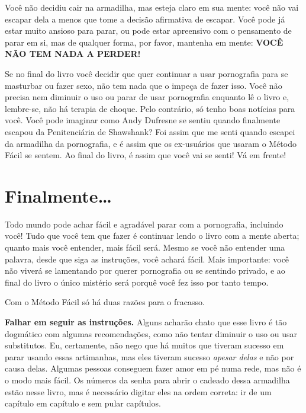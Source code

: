 \documentclass[
  spanish,
  openany]{book}
\begin{document}
Você não decidiu cair na armadilha, mas esteja claro em sua mente: você não vai escapar dela a menos que tome a decisão afirmativa de escapar. Você pode já estar muito ansioso para parar, ou pode estar apreensivo com o pensamento de parar em si, mas de qualquer forma, por favor, mantenha em mente: \textbf{VOCÊ NÃO TEM NADA A PERDER!}

Se no final do livro você decidir que quer continuar a usar pornografia para se masturbar ou fazer sexo, não tem nada que o impeça de fazer isso. Você não precisa nem diminuir o uso ou parar de usar pornografia enquanto lê o livro e, lembre-se, não há terapia de choque. Pelo contrário, só tenho boas notícias para você. Você pode imaginar como Andy Dufresne se sentiu quando finalmente escapou da Penitenciária de Shawshank? Foi assim que me senti quando escapei da armadilha da pornografia, e é assim que os ex-usuários que usaram o Método Fácil se sentem. Ao final do livro, é assim que você vai se senti! Vá em frente!

\hypertarget{finalmente}{%
\section*{Finalmente\ldots{}}\label{finalmente}}

Todo mundo pode achar fácil e agradável parar com a pornografia, incluindo você! Tudo que você tem que fazer é continuar lendo o livro com a mente aberta; quanto mais você entender, mais fácil será. Mesmo se você não entender uma palavra, desde que siga as instruções, você achará fácil. Mais importante: você não viverá se lamentando por querer pornografia ou se sentindo privado, e ao final do livro o único mistério será porquê você fez isso por tanto tempo.

Com o Método Fácil só há duas razões para o fracasso.

\textbf{Falhar em seguir as instruções.} Alguns acharão chato que esse livro é tão dogmático com algumas recomendações, como não tentar diminuir o uso ou usar substitutos. Eu, certamente, não nego que há muitos que tiveram sucesso em parar usando essas artimanhas, mas eles tiveram sucesso \emph{apesar delas} e não por causa delas. Algumas pessoas conseguem fazer amor em pé numa rede, mas não é o modo mais fácil. Os números da senha para abrir o cadeado dessa armadilha estão nesse livro, mas é necessário digitar eles na ordem correta: ir de um capítulo em capítulo e sem pular capítulos.
\end{document}
